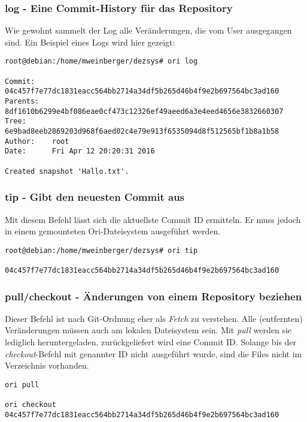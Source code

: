 \subsubsection{log - Eine Commit-History für das Repository}
\label{subsubsec:log - Eine Commit-History für das Repository}
Wie gewohnt sammelt der Log alle Veränderungen, die vom User ausgegangen sind. Ein Beispiel eines Logs wird hier gezeigt:
\begin{lstlisting}[frame=single, caption=log]
root@debian:/home/mweinberger/dezsys# ori log

Commit:    04c457f7e77dc1831eacc564bb2714a34df5b265d46b4f9e2b697564bc3ad160
Parents:   8df1610b6299e4bf086eae0cf473c12326ef49aeed6a3e4eed4656e3832660307
Tree:      6e9bad8eeb2869203d968f6aed02c4e79e913f6535094d8f512565bf1b8a1b58
Author:    root
Date:      Fri Apr 12 20:20:31 2016

Created snapshot 'Hallo.txt'.
\end{lstlisting}

\subsubsection{tip - Gibt den neuesten Commit aus}
\label{subsubsec:tip - Gibt den neuesten Commit aus}
Mit diesem Befehl lässt sich die aktuellste Commit ID ermitteln. Er muss jedoch in einem gemounteten Ori-Dateisystem ausgeführt werden.
\begin{lstlisting}[frame=single, caption=tip]
root@debian:/home/mweinberger/dezsys# ori tip

04c457f7e77dc1831eacc564bb2714a34df5b265d46b4f9e2b697564bc3ad160
\end{lstlisting}

\clearpage

\subsubsection{pull/checkout - Änderungen von einem Repository beziehen}
\label{subsubsec:pull/checkout - Änderungen von einem Repository beziehen}
Dieser Befehl ist nach Git-Ordnung eher als \textit{Fetch} zu verstehen. Alle (entfernten) Veränderungen müssen auch am lokalen Dateisystem sein. Mit \textit{pull} werden sie lediglich heruntergeladen, zurückgeliefert wird eine Commit ID. Solange bis der \textit{checkout}-Befehl mit genannter ID nicht ausgeführt wurde, sind die Files nicht im Verzeichnis vorhanden.
\begin{lstlisting}[frame=single, caption=pull]
ori pull

ori checkout 04c457f7e77dc1831eacc564bb2714a34df5b265d46b4f9e2b697564bc3ad160
\end{lstlisting}

